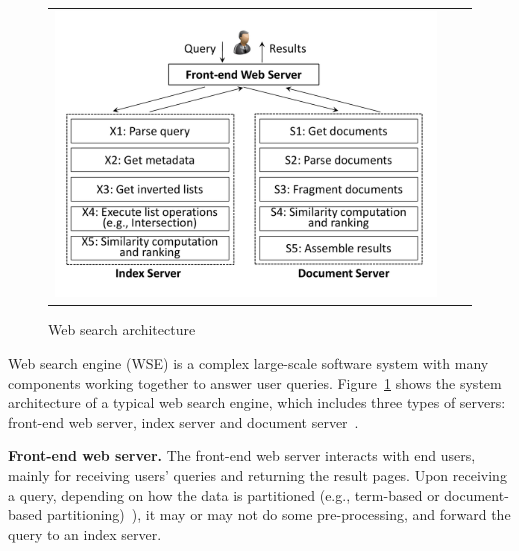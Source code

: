 \begin{figure}[htbp]
  \centering
  \begin{tabular}{ccc}
 \includegraphics[width=1.0\columnwidth]{figures/searchEngineArch.pdf}
\end{tabular}
  \caption{Web search architecture}
  \label{fig:searchEngineArch}
 \end{figure}


Web search engine (WSE) is a complex large-scale software system with many components working together to answer user queries. Figure~\ref{fig:searchEngineArch} shows the system architecture of a typical web search engine, which includes three types of servers: front-end web server, index server and document server~\cite{Barroso2003WSP,BaezaYates07ICDE}.


\textbf{Front-end web server.} The front-end web server interacts with end users, mainly for receiving users' queries and returning the result pages. Upon receiving a query, depending on how the data is partitioned (e.g., term-based or document-based partitioning)~\cite{Dean2009}), it may or may not do some pre-processing, and forward the query to an index server.

